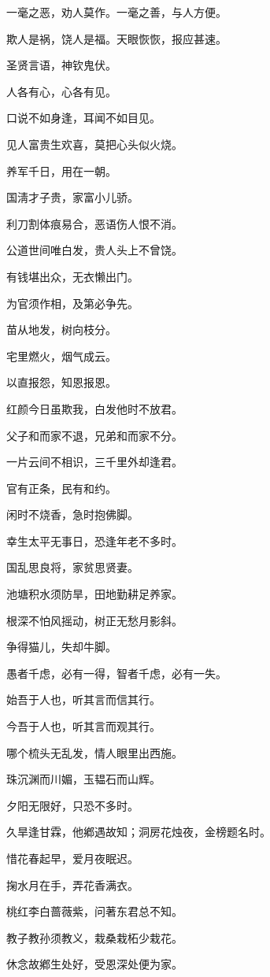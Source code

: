 \documentclass[12pt,oneside]{book}
\begin{document}
一毫之恶，劝人莫作。一毫之善，与人方便。

欺人是祸，饶人是福。天眼恢恢，报应甚速。

圣贤言语，神钦鬼伏。

人各有心，心各有见。

口说不如身逢，耳闻不如目见。

见人富贵生欢喜，莫把心头似火烧。

养军千日，用在一朝。

国淸才子贵，家富小儿骄。

利刀割体痕易合，恶语伤人恨不消。

公道世间唯白发，贵人头上不曾饶。

有钱堪出众，无衣懒出门。

为官须作相，及第必争先。

苗从地发，树向枝分。

宅里燃火，烟气成云。

以直报怨，知恩报恩。

红颜今日虽欺我，白发他时不放君。

父子和而家不退，兄弟和而家不分。

一片云间不相识，三千里外却逢君。

官有正条，民有和约。

闲时不烧香，急时抱佛脚。

幸生太平无事日，恐逢年老不多时。

国乱思良将，家贫思贤妻。

池塘积水须防旱，田地勤耕足养家。

根深不怕风摇动，树正无愁月影斜。

争得猫儿，失却牛脚。

愚者千虑，必有一得，智者千虑，必有一失。

始吾于人也，听其言而信其行。

今吾于人也，听其言而观其行。

哪个梳头无乱发，情人眼里出西施。

珠沉渊而川媚，玉韫石而山辉。

夕阳无限好，只恐不多时。

久旱逢甘霖，他鄕遇故知；洞房花烛夜，金榜题名时。

惜花春起早，爱月夜眠迟。

掬水月在手，弄花香满衣。

桃红李白蔷薇紫，问著东君总不知。

教子教孙须教义，栽桑栽柘少栽花。

休念故鄕生处好，受恩深处便为家。
\end{document}
